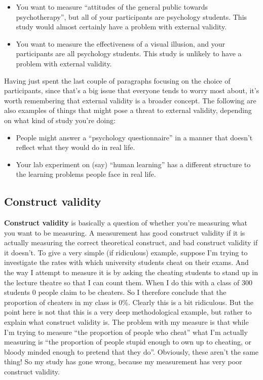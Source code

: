\documentclass[
  a4paper,
]{book}
\providecommand{\tightlist}{%
  \setlength{\itemsep}{0pt}\setlength{\parskip}{0pt}}
\begin{document}
\begin{itemize}
\tightlist
\item
  You want to measure ``attitudes of the general public towards
  psychotherapy'', but all of your participants are psychology students.
  This study would almost certainly have a problem with external
  validity.
\item
  You want to measure the effectiveness of a visual illusion, and your
  participants are all psychology students. This study is unlikely to
  have a problem with external validity.
\end{itemize}

Having just spent the last couple of paragraphs focusing on the choice
of participants, since that's a big issue that everyone tends to worry
most about, it's worth remembering that external validity is a broader
concept. The following are also examples of things that might pose a
threat to external validity, depending on what kind of study you're
doing:

\begin{itemize}
\tightlist
\item
  People might answer a ``psychology questionnaire'' in a manner that
  doesn't reflect what they would do in real life.
\item
  Your lab experiment on (say) ``human learning'' has a different
  structure to the learning problems people face in real life.
\end{itemize}

\subsection{Construct validity}\label{construct-validity}

\textbf{Construct validity} is basically a question of whether you're
measuring what you want to be measuring. A measurement has good
construct validity if it is actually measuring the correct theoretical
construct, and bad construct validity if it doesn't. To give a very
simple (if ridiculous) example, suppose I'm trying to investigate the
rates with which university students cheat on their exams. And the way I
attempt to measure it is by asking the cheating students to stand up in
the lecture theatre so that I can count them. When I do this with a
class of 300 students 0 people claim to be cheaters. So I therefore
conclude that the proportion of cheaters in my class is 0\%. Clearly
this is a bit ridiculous. But the point here is not that this is a very
deep methodological example, but rather to explain what construct
validity is. The problem with my measure is that while I'm trying to
measure ``the proportion of people who cheat'' what I'm actually
measuring is ``the proportion of people stupid enough to own up to
cheating, or bloody minded enough to pretend that they do''. Obviously,
these aren't the same thing! So my study has gone wrong, because my
measurement has very poor construct validity.
\end{document}
